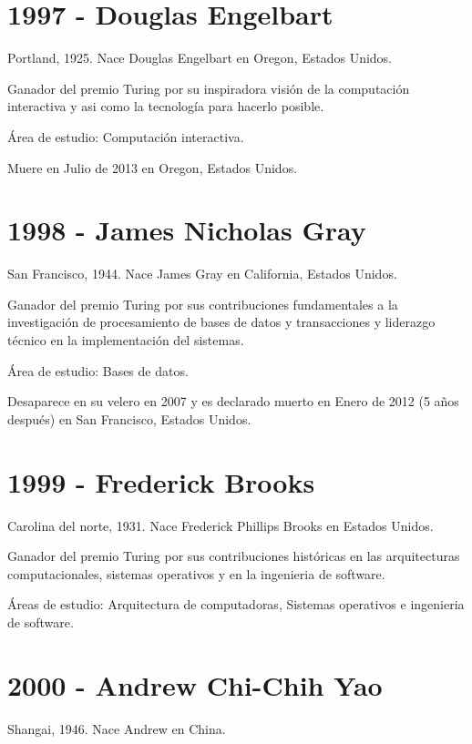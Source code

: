 \documentclass[a4paper, 11pt]{article}
\begin{document}
\section*{1997 - Douglas Engelbart}
\noindent Portland, 1925. Nace Douglas Engelbart en Oregon, Estados Unidos.

\noindent Ganador del premio Turing por su inspiradora visión de la computación interactiva y asi como la tecnología para hacerlo posible.

\noindent Área de estudio: Computación interactiva. 

\noindent Muere en Julio de 2013 en Oregon, Estados Unidos.
\newline


\section*{1998 - James Nicholas Gray}
\noindent San Francisco, 1944. Nace James Gray en California, Estados Unidos.

\noindent Ganador del premio Turing por sus contribuciones fundamentales a la investigación de procesamiento de bases de datos y transacciones y liderazgo técnico en la implementación del sistemas.

\noindent Área de estudio: Bases de datos. 

\noindent Desaparece en su velero en 2007 y es declarado muerto en Enero de 2012 (5 años después) en San Francisco, Estados Unidos.
\newline

\section*{1999 - Frederick Brooks}
\noindent Carolina del norte, 1931. Nace Frederick Phillips Brooks en Estados Unidos.

\noindent Ganador del premio Turing por sus contribuciones históricas en las arquitecturas computacionales, sistemas operativos y en la ingenieria de software.

\noindent Áreas de estudio: Arquitectura de computadoras, Sistemas operativos e ingenieria de software. 
\newline

\section*{2000 - Andrew Chi-Chih Yao}
\noindent Shangai, 1946. Nace Andrew en China.
\end{document}
